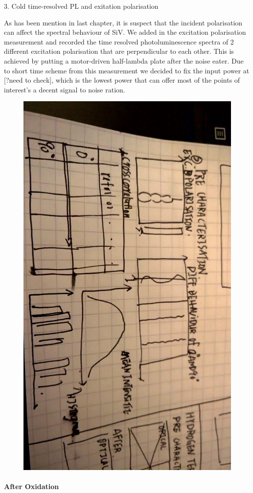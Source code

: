 3. Cold time-resolved PL and exitation polarisation

As has been mention in last chapter, it is suspect that the incident polarisation can affect the spectral behaviour of SiV. We added in the excitation polarisation measurement and recorded the time resolved photoluminescence spectra of 2 different excitation polarisation that are perpendicular to each other. This is achieved by putting a motor-driven half-lambda plate after the noise eater. 
Due to short time scheme from this measurement we decided to fix the input power at [?need to check], which is the lowest power that can offer most of the points of interest's a decent signal to noise ration.
\FloatBarrier
\begin{figure}[h]
\centering
\includegraphics[width=0.7\linewidth]{Figures/pic/WP_20160921_21_04_59_Moment}
\caption{}
\label{fig:wp20160921210459moment}
\end{figure}
\FloatBarrier



\paragraph{After Oxidation} 

